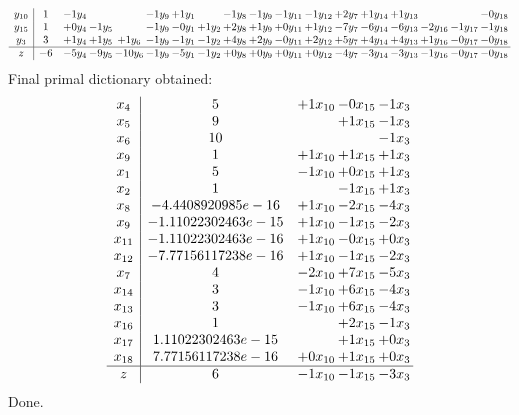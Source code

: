 \documentclass[11pt]{article}
\begin{document}
\[\begin{array}{c| c c@{\hskip 2pt} c@{\hskip 2pt} c@{\hskip 2pt} c@{\hskip 2pt} c@{\hskip 2pt} c@{\hskip 2pt} c@{\hskip 2pt} c@{\hskip 2pt} c@{\hskip 2pt} c@{\hskip 2pt} c@{\hskip 2pt} c@{\hskip 2pt} c@{\hskip 2pt} c@{\hskip 2pt} c@{\hskip 2pt} c@{\hskip 2pt} }
 y_{10}   &  1 & -1 y_{4} &    &   & -1 y_{9} & + 1 y_{1} &   & -1 y_{8} & -1 y_{9} & -1 y_{11} & -1 y_{12} & + 2 y_{7} & + 1 y_{14} & + 1 y_{13} &    &   & -0 y_{18}\\
 y_{15}   &  1 & + 0 y_{4} & -1 y_{5} &   & -1 y_{9} & -0 y_{1} & + 1 y_{2} & + 2 y_{8} & + 1 y_{9} & + 0 y_{11} & + 1 y_{12} & -7 y_{7} & -6 y_{14} & -6 y_{13} & -2 y_{16} & -1 y_{17} & -1 y_{18}\\
 y_{3}   &  3 & + 1 y_{4} & + 1 y_{5} & + 1 y_{6} & -1 y_{9} & -1 y_{1} & -1 y_{2} & + 4 y_{8} & + 2 y_{9} & -0 y_{11} & + 2 y_{12} & + 5 y_{7} & + 4 y_{14} & + 4 y_{13} & + 1 y_{16} & -0 y_{17} & -0 y_{18}\\
\hline
z    &  -6 & -5 y_{4} & -9 y_{5} & -10 y_{6} & -1 y_{9} & -5 y_{1} & -1 y_{2} & + 0 y_{8} & + 0 y_{9} & + 0 y_{11} & + 0 y_{12} & -4 y_{7} & -3 y_{14} & -3 y_{13} & -1 y_{16} & -0 y_{17} & -0 y_{18}\\
\end{array}\]
 Final primal dictionary obtained: 
\[\begin{array}{c| c c@{\hskip 2pt} c@{\hskip 2pt} c@{\hskip 2pt} }
 x_{4}   &  5 & + 1 x_{10} & -0 x_{15} & -1 x_{3}\\
 x_{5}   &  9  &   & + 1 x_{15} & -1 x_{3}\\
 x_{6}   &  10  &    &   & -1 x_{3}\\
 x_{9}   &  1 & + 1 x_{10} & + 1 x_{15} & + 1 x_{3}\\
 x_{1}   &  5 & -1 x_{10} & + 0 x_{15} & + 1 x_{3}\\
 x_{2}   &  1  &   & -1 x_{15} & + 1 x_{3}\\
 x_{8}   &  -4.4408920985e-16 & + 1 x_{10} & -2 x_{15} & -4 x_{3}\\
 x_{9}   &  -1.11022302463e-15 & + 1 x_{10} & -1 x_{15} & -2 x_{3}\\
 x_{11}   &  -1.11022302463e-16 & + 1 x_{10} & -0 x_{15} & + 0 x_{3}\\
 x_{12}   &  -7.77156117238e-16 & + 1 x_{10} & -1 x_{15} & -2 x_{3}\\
 x_{7}   &  4 & -2 x_{10} & + 7 x_{15} & -5 x_{3}\\
 x_{14}   &  3 & -1 x_{10} & + 6 x_{15} & -4 x_{3}\\
 x_{13}   &  3 & -1 x_{10} & + 6 x_{15} & -4 x_{3}\\
 x_{16}   &  1  &   & + 2 x_{15} & -1 x_{3}\\
 x_{17}   &  1.11022302463e-15  &   & + 1 x_{15} & + 0 x_{3}\\
 x_{18}   &  7.77156117238e-16 & + 0 x_{10} & + 1 x_{15} & + 0 x_{3}\\
\hline
z    &  6 & -1 x_{10} & -1 x_{15} & -3 x_{3}\\
\end{array}\]
Done.
\end{document}
